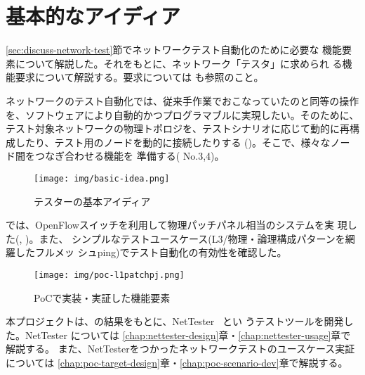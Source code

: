  \section{基本的なアイディア}
 \label{sec:basic-tester-idea}



\ref{sec:discuss-network-test}節でネットワークテスト自動化のために必要な
機能要素について解説した。それをもとに、ネットワーク「テスタ」に求められ
る機能要求について解説する。要求については \lopjtech も参照のこと。

ネットワークのテスト自動化では、従来手作業でおこなっていたのと同等の操作
を、ソフトウェアにより自動的かつプログラマブルに実現したい。そのために、
テスト対象ネットワークの物理トポロジを、テストシナリオに応じて動的に再構
成したり、テスト用のノードを動的に接続したりする
()。そこで、様々なノード間をつなぎ合わせる機能を
準備する( No.3,4)。

\begin{figure}[h]
 \centering
 \texttt{[image: img/basic-idea.png]}
 \caption{テスターの基本アイディア}
 \label{fig:basic-idea}
\end{figure}

\lopj では、OpenFlowスイッチを利用して物理パッチパネル相当のシステムを実
現した(, )。また、
シンプルなテストユースケース(L3/物理・論理構成パターンを網羅したフルメッ
シュping)でテスト自動化の有効性を確認した。

\begin{figure}[h]
 \centering \texttt{[image: img/poc-l1patchpj.png]}
 \caption{\lopj PoCで実装・実証した機能要素} \label{fig:poc-l1patchpj}
\end{figure}



 本プロジェクトは、\lopj の結果をもとに、NetTester~\cite{nettester} とい
 うテストツールを開発した。NetTester については
 \ref{chap:nettester-design}章・\ref{chap:nettester-usage}章で解説する。
 また、NetTesterをつかったネットワークテストのユースケース実証については
 \ref{chap:poc-target-design}章・\ref{chap:poc-scenario-dev}章で解説する。


